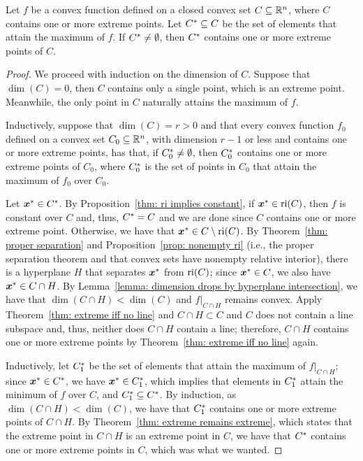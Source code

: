 \begin{theorem}\label{Bauer}
Let $f$ be a convex function defined on a closed convex set $C\subseteq \mathbb R^{n}$, where $C$ contains one or more extreme points. Let $C^\ast\subseteq C$ be the set of elements that attain the maximum of $f$. If $C^\ast\neq\emptyset$, then $C^\ast$ contains one or more extreme points of $C$.
\end{theorem}
\begin{proof}
We proceed with induction on the dimension of $C$. Suppose that $\dim(C) = 0 $, then $C$ contains only a single point, which is an extreme point. Meanwhile, the only point in $C$ naturally attains the maximum of $f$. 

Inductively, suppose that $\dim(C) = r > 0$ and that every convex function $f_0$ defined on a convex set $C_0\subseteq \mathbb R^{n}$, with dimension $r-1$ or less and contains one or more extreme points, has that, if $C_0^\ast\neq\emptyset$, then $C_0^\ast$ contains one or more extreme points of $C_0$, where $C_0^\ast$ is the set of points in $C_0$ that attain the maximum of $f_0$ over $C_0$.

Let ${\boldsymbol x}^\ast\in C^\ast$. By Proposition~\ref{thm: ri implies constant}, if ${\boldsymbol x}^\ast \in\operatorname{ri}(C)$, then $f$ is constant over $C$ and, thus, $C^\ast = C$ and we are done since $C$ contains one or more extreme point. Otherwise, we have that ${\boldsymbol x}^\ast\in C\setminus \operatorname{ri}(C)$. By Theorem~\ref{thm: proper separation} and Proposition~\ref{prop: nonempty ri} (i.e., the proper separation theorem and that convex sets have nonempty relative interior), there is a hyperplane $H$ that separates ${\boldsymbol x}^\ast$ from $\operatorname{ri}(C)$; since ${\boldsymbol x}^\ast\in C$, we also have ${\boldsymbol x}^\ast\in C\cap H$. By Lemma~\ref{lemma: dimension drops by hyperplane intersection}, we have that $\dim(C\cap H) < \dim(C)$ and $f|_{C\cap H}$ remains convex. Apply Theorem~\ref{thm: extreme iff no line} and $C\cap H\subset C$ and $C$ does not contain a line subspace and, thus, neither does $C\cap H$ contain a line; therefore, $C\cap H$ contains one or more extreme points by Theorem~\ref{thm: extreme iff no line} again. 

Inductively, let $C_1^\ast$ be the set of elements that attain the maximum of $f|_{C\cap H}$; since ${\boldsymbol x}^\ast \in C^\ast$, we have ${\boldsymbol x}^\ast \in C^\ast_1$, which implies that elements in $C^\ast_1$ attain the minimum of $f$ over $C$, and $C_1^\ast \subseteq C^\ast$. By induction, as $\dim(C\cap H)<\dim(C)$, we have that $C_1^\ast$ contains one or more extreme points of $C\cap H$. By Theorem~\ref{thm: extreme remains extreme}, which states that the extreme point in $C\cap H$ is an extreme point in $C$, we have that $C^\ast$ contains one or more extreme points in $C$, which was what we wanted. 
\end{proof}

